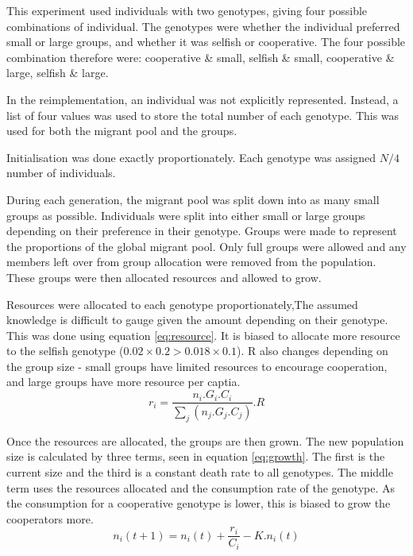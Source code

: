 \documentclass[11pt]{ecsarticle}
\begin{document}
This experiment used individuals with two genotypes, giving four possible combinations of individual.
The genotypes were whether the individual preferred small or large groups, and whether it was selfish or cooperative.
The four possible combination therefore were: cooperative \& small, selfish \& small, cooperative \& large, selfish \& large. 

In the reimplementation, an individual was not explicitly represented. 
Instead, a list of four values was used to store the total number of each genotype. 
This was used for both the migrant pool and the groups. 

Initialisation was done exactly proportionately. Each genotype was assigned $N / 4$ number of individuals.

During each generation, the migrant pool was split down into as many small groups as possible.
Individuals were split into either small or large groups depending on their preference in their genotype.
Groups were made to represent the proportions of the global migrant pool. 
Only full groups were allowed and any members left over from group allocation were removed from the population. 
These groups were then allocated resources and allowed to grow. 

Resources were allocated to each genotype proportionately,The assumed knowledge is difficult to gauge given the amount depending on their genotype.
This was done using equation \eqref{eq:resource}. 
It is biased to allocate more resource to the selfish genotype ($0.02 \times 0.2 > 0.018 \times 0.1$). 
R also changes depending on the group size - small groups have limited resources to encourage cooperation, and large groups have more resource per captia.
\begin{equation}
 r_i = \frac{ n_i . G_i . C_i }{\sum\limits_j (n_j . G_j . C_j )} . R 
 \label{eq:resource}
\end{equation}

Once the resources are allocated, the groups are then grown. 
The new population size is calculated by three terms, seen in equation \ref{eq:growth}. 
The first is the current size and the third is a constant death rate to all genotypes.
The middle term uses the resources allocated and the consumption rate of the genotype.
As the consumption for a cooperative genotype is lower, this is biased to grow the cooperators more.
\begin{equation}
 n_i (t + 1) = n_i (t) + \frac{r_i}{C_i} - K.n_i (t)
 \label{eq:growth}
\end{equation}
\end{document}
